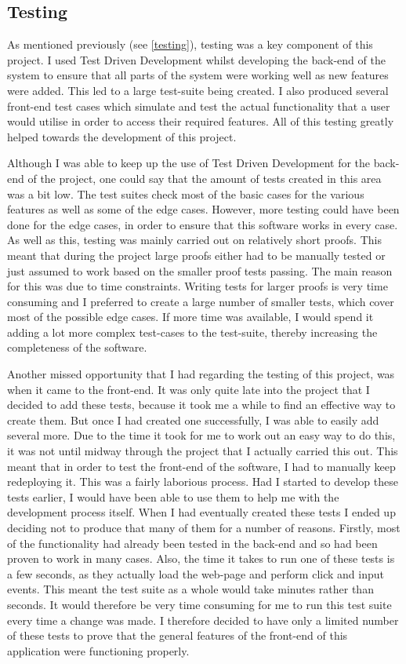 \subsection{Testing}
As mentioned previously (see \ref{testing}), testing was a key component of this project. I used Test Driven Development whilst developing the back-end of the system to ensure that all parts of the system were working well as new features were added. This led to a large test-suite being created. I also produced several front-end test cases which simulate and test the actual functionality that a user would utilise in order to access their required features. All of this testing greatly helped towards the development of this project.

Although I was able to keep up the use of Test Driven Development for the back-end of the project, one could say that the amount of tests created in this area was a bit low. The test suites check most of the basic cases for the various features as well as some of the edge cases. However, more testing could have been done for the edge cases, in order to ensure that this software works in every case. As well as this, testing was mainly carried out on relatively short proofs. This meant that during the project large proofs either had to be manually tested or just assumed to work based on the smaller proof tests passing. The main reason for this was due to time constraints. Writing tests for larger proofs is very time consuming and I preferred to create a large number of smaller tests, which cover most of the possible edge cases. If more time was available, I would spend it adding a lot more complex test-cases to the test-suite, thereby increasing the completeness of the software.

Another missed opportunity that I had regarding the testing of this project, was when it came to the front-end. It was only quite late into the project that I decided to add these tests, because it took me a while to find an effective way to create them. But once I had created one successfully, I was able to easily add several more. Due to the time it took for me to work out an easy way to do this, it was not until midway through the project that I actually carried this out. This meant that in order to test the front-end of the software, I had to manually keep redeploying it. This was a fairly laborious process. Had I started to develop these tests earlier, I would have been able to use them to help me with the development process itself. When I had eventually created these tests I ended up deciding not to produce that many of them for a number of reasons. Firstly, most of the functionality had already been tested in the back-end and so had been proven to work in many cases. Also, the time it takes to run one of these tests is a few seconds, as they actually load the web-page and perform click and input events. This meant the test suite as a whole would take minutes rather than seconds. It would therefore be very time consuming for me to run this test suite every time a change was made. I therefore decided to have only a limited number of these tests to prove that the general features of the front-end of this application were functioning properly.


